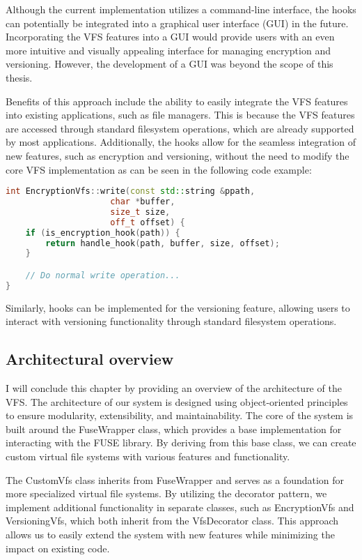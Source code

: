 Although the current implementation utilizes a command-line interface, the hooks can potentially be integrated into a graphical user interface (GUI) in the future.
Incorporating the VFS features into a GUI would provide users with an even more intuitive and visually appealing interface for managing encryption and versioning.
However, the development of a GUI was beyond the scope of this thesis.

Benefits of this approach include the ability to easily integrate the VFS features into existing applications, such as file managers.
This is because the VFS features are accessed through standard filesystem operations, which are already supported by most applications.
Additionally, the hooks allow for the seamless integration of new features, such as encryption and versioning, without the need to modify the core VFS implementation as can be seen in the following code example:

\begin{lstlisting}[language=c++, basicstyle=\ttfamily\small]
int EncryptionVfs::write(const std::string &ppath,
                     char *buffer,
                     size_t size,
                     off_t offset) {
    if (is_encryption_hook(path)) {
        return handle_hook(path, buffer, size, offset);
    }

    // Do normal write operation...
}
\end{lstlisting}

Similarly, hooks can be implemented for the versioning feature, allowing users to interact with versioning functionality through standard filesystem operations.

\subsection{Architectural overview}\label{subsec:overview}

I will conclude this chapter by providing an overview of the architecture of the VFS\@.
The architecture of our system is designed using object-oriented principles to ensure modularity, extensibility, and maintainability.
The core of the system is built around the FuseWrapper class, which provides a base implementation for interacting with the FUSE library.
By deriving from this base class, we can create custom virtual file systems with various features and functionality.

The CustomVfs class inherits from FuseWrapper and serves as a foundation for more specialized virtual file systems.
By utilizing the decorator pattern, we implement additional functionality in separate classes, such as EncryptionVfs and VersioningVfs, which both inherit from the VfsDecorator class.
This approach allows us to easily extend the system with new features while minimizing the impact on existing code.

